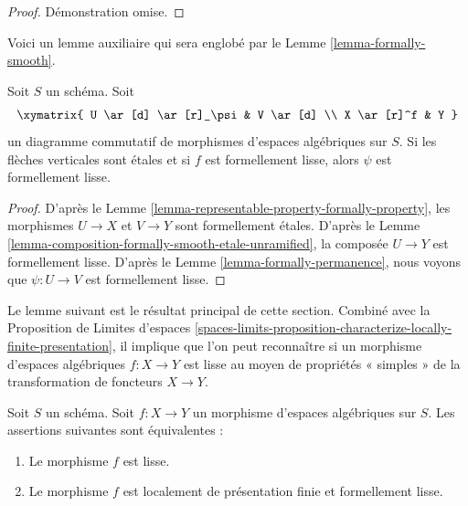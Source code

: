 \begin{proof}
Démonstration omise.
\end{proof}

\noindent
Voici un lemme auxiliaire qui sera englobé par le
Lemme \ref{lemma-formally-smooth}.

\begin{lemma}
\label{lemma-helper-formally-smooth}
Soit $S$ un schéma. Soit
$$
\xymatrix{
U \ar[d] \ar[r]_\psi & V \ar[d] \\
X \ar[r]^f & Y
}
$$
un diagramme commutatif de morphismes d'espaces algébriques sur $S$.
Si les flèches verticales sont étales et si $f$ est formellement lisse, alors
$\psi$ est formellement lisse.
\end{lemma}

\begin{proof}
D'après le
Lemme \ref{lemma-representable-property-formally-property},
les morphismes $U \to X$ et $V \to Y$ sont formellement étales. D'après le
Lemme \ref{lemma-composition-formally-smooth-etale-unramified},
la composée $U \to Y$ est formellement lisse. D'après le
Lemme \ref{lemma-formally-permanence},
nous voyons que $\psi : U \to V$ est formellement lisse.
\end{proof}

\noindent
Le lemme suivant est le résultat principal de cette section.
Combiné avec la
Proposition de Limites d'espaces
\ref{spaces-limits-proposition-characterize-locally-finite-presentation},
il implique que l'on peut reconnaître si un morphisme d'espaces algébriques
$f : X \to Y$ est lisse au moyen de propriétés « simples » de la
transformation de foncteurs $X \to Y$.

\begin{lemma}
\label{lemma-smooth-formally-smooth}
Soit $S$ un schéma.
Soit $f : X \to Y$ un morphisme d'espaces algébriques sur $S$.
Les assertions suivantes sont équivalentes :
\begin{enumerate}
\item Le morphisme $f$ est lisse.
\item Le morphisme $f$ est localement de présentation finie et
formellement lisse.
\end{enumerate}
\end{lemma}

